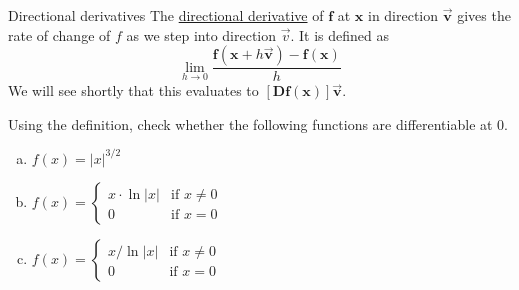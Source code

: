 \begin{defn}{Directional derivatives}
The \ul{directional derivative} of $\bm{f}$ at $\bm{x}$ in direction $\vec{\bm{v}}$ gives the rate of change of $f$ as we step into direction $\vec{v}$. It is defined as
\[\lim_{h\to 0}\frac{\bm{f}(\bm{x}+h\vec{\bm{v}})-\bm{f}(\bm{x})}{h}\]
We will see shortly that this evaluates to $[\bm{Df}(\bm{x})]\vec{\bm{v}}$.
\end{defn}

 Using the definition, check whether the following functions are differentiable at 0.
\begin{enumerate}[a.]
  \item $f(x) = |x|^{3/2}$ \\
  \item $\displaystyle f(x) = \begin{cases}x \cdot \ln{|x|} & \text{if } x \neq 0 \\ 0 & \text{if } x = 0 \end{cases}$ \\
  \item $\displaystyle f(x) = \begin{cases}x/ \ln{|x|} & \text{if } x \neq 0 \\ 0 & \text{if } x = 0\end{cases}$ \\
\end{enumerate}
